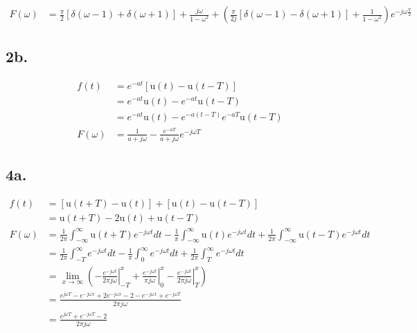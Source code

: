 \documentclass[letterpaper]{article}
\begin{document}
\begin{align*}
    F(\omega) &= \frac{\pi}{2} \left[\delta(\omega - 1)+\delta(\omega +1)\right] + \frac{j\omega}{1-\omega^2} + \left( \frac{\pi}{2j} \left[\delta(\omega - 1)-\delta(\omega +1)\right] + \frac{1}{1-\omega^2} \right) e^{-j\omega \frac{\pi}{2}}
\end{align*}

\subsection*{2b.}
\begin{align*}
    f(t) &=e^{-at}\left[\mathrm{u}\left(t\right) - \mathrm{u}\left(t - T\right)\right]\\
    &=e^{-at}\mathrm{u}\left(t\right) - e^{-at}\mathrm{u}\left(t - T\right)\\
    &=e^{-at}\mathrm{u}\left(t\right) - e^{-a(t-T)}e^{-aT}\mathrm{u}\left(t - T\right)\\
    F(\omega)&=\frac{1}{a+j\omega}-\frac{e^{-aT}}{a+j\omega} e^{-j\omega T}
\end{align*}
\newpage
\subsection*{4a.}
\begin{align*}
    f(t) &=\left[\mathrm{u}\left(t+T\right) - \mathrm{u}\left(t\right)\right] + \left[\mathrm{u}\left(t\right) - \mathrm{u}\left(t - T\right)\right]\\
    &=\mathrm{u}\left(t+T\right) - 2 \mathrm{u}\left(t\right) + \mathrm{u}\left(t - T\right)\\
    F(\omega)&=\frac{1}{2\pi}\int_{-\infty}^{\infty}\mathrm{u}\left(t+T\right) e^{-j \omega t} dt - \frac{1}{\pi}\int_{-\infty}^{\infty}\mathrm{u}\left(t\right) e^{-j \omega t} dt + \frac{1}{2\pi}\int_{-\infty}^{\infty}\mathrm{u}\left(t-T\right) e^{-j \omega t} dt\\
    &=\frac{1}{2\pi}\int_{-T}^{\infty}e^{-j \omega t} dt - \frac{1}{\pi}\int_{0}^{\infty}e^{-j \omega t} dt + \frac{1}{2\pi}\int_{T}^{\infty}e^{-j \omega t} dt\\
    &= \lim\limits_{x \to \infty} \left( - \left. \frac{e^{-j\omega t}}{2\pi j \omega} \right\rvert_{-T}^x + \left. \frac{e^{-j\omega t}}{\pi j \omega} \right\rvert_0^x - \left.\frac{e^{-j\omega t}}{2\pi j \omega} \right\rvert_T^x \right)\\
    &= \frac{e^{j\omega T} - e^{-j \omega x} + 2 e^{-j \omega x} - 2 - e^{-j \omega x} + e^{-j \omega T}}{2\pi j \omega}\\
    &= \frac{e^{j\omega T} + e^{-j\omega T} - 2}{2\pi j \omega}
\end{align*}
\end{document}
